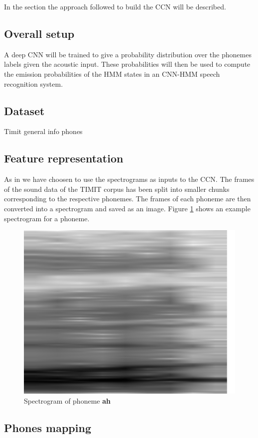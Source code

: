 In the section the approach followed to build the CCN will be described.
\subsection{Overall setup}
A deep CNN will be trained to give a probability distribution over the phonemes labels given the acoustic input. These probabilities will then be used to compute the emission probabilities of the HMM states in an CNN-HMM speech recognition system.
\subsection{Dataset}
Timit general info
phones
\subsection{Feature representation}
As in \cite{graves2014towards} we have choosen to use the spectrograms as inputs to the CCN. The frames of the sound data of the  TIMIT corpus has been split into smaller chunks corresponding to the respective phonemes. The frames of each phoneme are then converted into a spectrogram and saved as an image. Figure \ref{fig:spect} shows an example spectrogram for a phoneme.
\begin{figure}[H]
\centering
\includegraphics[width=1\linewidth]{figs/ah.png}
\caption{Spectrogram of phoneme \textbf{ah}}
\label{fig:spect}
\end{figure}
\subsection{Phones mapping}

